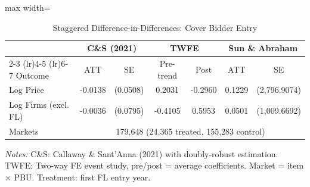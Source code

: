 \begin{table}[htbp]
\centering
\caption{Staggered Difference-in-Differences: Cover Bidder Entry}
\label{tab:did_cs}
\begin{adjustbox}{max width=\textwidth}
\begin{threeparttable}
\small
\begin{tabular}{lcccccc}
\toprule
 & \multicolumn{2}{c}{C\&S (2021)} & \multicolumn{2}{c}{TWFE} & \multicolumn{2}{c}{Sun \& Abraham} \\
\cmidrule(lr){2-3} \cmidrule(lr){4-5} \cmidrule(lr){6-7}
Outcome & ATT & SE & Pre-trend & Post & ATT & SE \\
\midrule
Log Price & -0.0138 & (0.0508) & 0.2031 & -0.2960 & 0.1229 & (2,796.9074) \\
Log Firms (excl. FL) & -0.0036 & (0.0795) & -0.4105 & 0.5953 & 0.0501 & (1,009.6692) \\
\midrule
Markets & \multicolumn{6}{c}{179,648 (24,365 treated, 155,283 control)} \\
\bottomrule
\end{tabular}
\begin{tablenotes}
\small
\item \textit{Notes:} C\&S: Callaway \& Sant'Anna (2021) with doubly-robust estimation.
TWFE: Two-way FE event study, pre/post = average coefficients.
Market = item $\times$ PBU. Treatment: first FL entry year.
\end{tablenotes}
\end{threeparttable}
\end{adjustbox}
\end{table}
